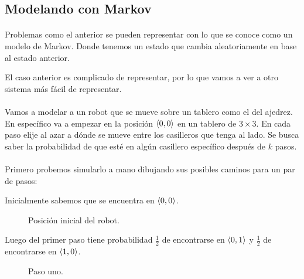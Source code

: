 \documentclass[../main.tex]{subfiles}
\begin{document}
\subsection{Modelando con Markov}

\paragraph{} Problemas como el anterior se pueden representar con lo que se conoce como un modelo de Markov. Donde tenemos un estado que cambia aleatoriamente en base al estado anterior.

El caso anterior es complicado de representar, por lo que vamos a ver a otro sistema más fácil de representar.

\paragraph{} Vamos a modelar a un robot que se mueve sobre un tablero como el del ajedrez.  En específico va a empezar en la posición \(\langle 0, 0 \rangle\) en un tablero de \(3 \times 3\). En cada paso elije al azar a dónde se mueve entre los casilleros que tenga al lado. Se busca saber la probabilidad de que esté en algún casillero específico después de \(k\) pasos.

\paragraph{} Primero probemos simularlo a mano dibujando sus posibles caminos para un par de pasos:

Inicialmente sabemos que se encuentra en \(\langle 0, 0 \rangle\).

\begin{figure}[H]
  \centering
  \caption{Posición inicial del robot.}
\end{figure}

Luego del primer paso tiene probabilidad \(\frac{1}{2}\) de encontrarse en \(\langle 0, 1 \rangle\) y \(\frac{1}{2}\) de encontrarse en \(\langle 1, 0 \rangle\).

\begin{figure}[H]
  \centering
  \caption{Paso uno.}
\end{figure}
\end{document}
